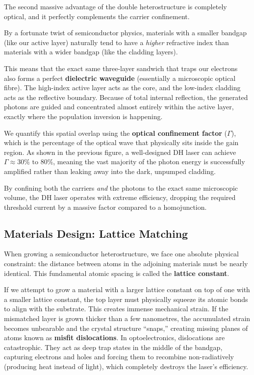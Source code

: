 The second massive advantage of the double heterostructure is completely optical, and it perfectly complements the carrier confinement. 

By a fortunate twist of semiconductor physics, materials with a smaller bandgap (like our active layer) naturally tend to have a \emph{higher} refractive index than materials with a wider bandgap (like the cladding layers). 

This means that the exact same three-layer sandwich that traps our electrons also forms a perfect \textbf{dielectric waveguide} (essentially a microscopic optical fibre). The high-index active layer acts as the core, and the low-index cladding acts as the reflective boundary. Because of total internal reflection, the generated photons are guided and concentrated almost entirely within the active layer, exactly where the population inversion is happening. 

We quantify this spatial overlap using the \textbf{optical confinement factor} ($\Gamma$), which is the percentage of the optical wave that physically sits inside the gain region. As shown in the previous figure, a well-designed DH laser can achieve $\Gamma \approx 30\% \text{ to } 80\%$, meaning the vast majority of the photon energy is successfully amplified rather than leaking away into the dark, unpumped cladding. 

By confining both the carriers \emph{and} the photons to the exact same microscopic volume, the DH laser operates with extreme efficiency, dropping the required threshold current by a massive factor compared to a homojunction.

\subsection{Materials Design: Lattice Matching}

When growing a semiconductor heterostructure, we face one absolute physical constraint: the distance between atoms in the adjoining materials must be nearly identical. This fundamental atomic spacing is called the \textbf{lattice constant}.

If we attempt to grow a material with a larger lattice constant on top of one with a smaller lattice constant, the top layer must physically squeeze its atomic bonds to align with the substrate. This creates immense mechanical strain. If the mismatched layer is grown thicker than a few nanometres, the accumulated strain becomes unbearable and the crystal structure ``snaps,'' creating missing planes of atoms known as \textbf{misfit dislocations}. In optoelectronics, dislocations are catastrophic. They act as deep trap states in the middle of the bandgap, capturing electrons and holes and forcing them to recombine non-radiatively (producing heat instead of light), which completely destroys the laser's efficiency. 


